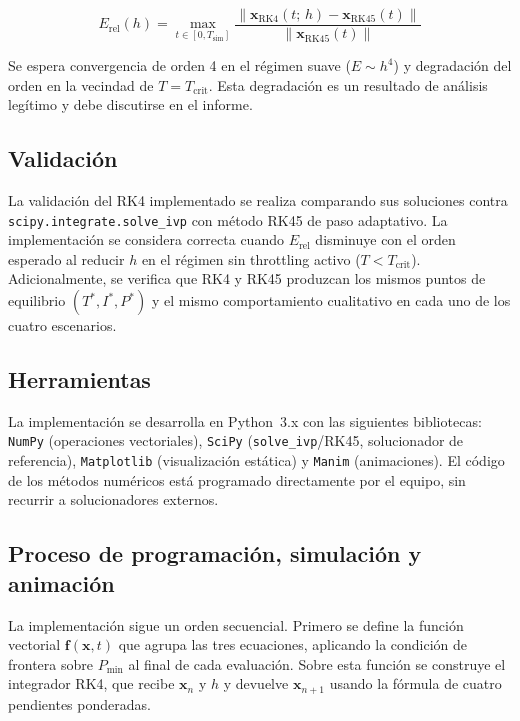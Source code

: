 \documentclass[10pt, twocolumn]{article}
\begin{document}
\begin{equation}
  E_{\text{rel}}(h) = \max_{t \in [0, T_{\text{sim}}]}
  \frac{\|\mathbf{x}_{\text{RK4}}(t;\,h) - \mathbf{x}_{\text{RK45}}(t)\|}
       {\|\mathbf{x}_{\text{RK45}}(t)\|}
\end{equation}

Se espera convergencia de orden 4 en el régimen suave ($E \sim h^4$) y degradación
del orden en la vecindad de $T = T_{\text{crit}}$. Esta degradación es un resultado
de análisis legítimo y debe discutirse en el informe.

\subsection{Validación}

La validación del RK4 implementado se realiza comparando sus soluciones contra
\texttt{scipy.integrate.solve\_ivp} con método RK45 de paso adaptativo. La
implementación se considera correcta cuando $E_{\text{rel}}$ disminuye con el orden
esperado al reducir $h$ en el régimen sin throttling activo ($T < T_{\text{crit}}$).
Adicionalmente, se verifica que RK4 y RK45 produzcan los mismos puntos de
equilibrio $(T^*, I^*, P^*)$ y el mismo comportamiento cualitativo en cada uno de
los cuatro escenarios.

\subsection{Herramientas}

La implementación se desarrolla en Python~3.x con las siguientes bibliotecas:
\texttt{NumPy} (operaciones vectoriales), \texttt{SciPy} (\texttt{solve\_ivp}/RK45,
solucionador de referencia), \texttt{Matplotlib} (visualización estática) y
\texttt{Manim} (animaciones). El código de los métodos numéricos está programado
directamente por el equipo, sin recurrir a solucionadores externos.

\subsection{Proceso de programación, simulación y animación}

La implementación sigue un orden secuencial. Primero se define la función vectorial
$\mathbf{f}(\mathbf{x}, t)$ que agrupa las tres ecuaciones, aplicando la condición
de frontera sobre $P_{\min}$ al final de cada evaluación. Sobre esta función se
construye el integrador RK4, que recibe $\mathbf{x}_n$ y $h$ y devuelve
$\mathbf{x}_{n+1}$ usando la fórmula de cuatro pendientes ponderadas.
\end{document}
